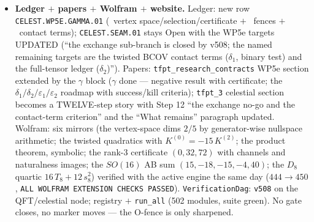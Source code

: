 \begin{itemize}[leftmargin=1.5em]
$+$ sharpened; flipped rule $m{+}j{-}j'$: $\Phi_{T_3}$ kill flip-invariant, $\Phi_P$
rule-dependent; $SO(16)$: odd classes EMPTY and AB sum $(15,-18,-15,-4,40)$ --- $T_5$ does not
even cancel ($E_8$ doubly special); $D_8$: $16\,T_8{+}12\,s_8^2$, no $T_3$ structure --- the
question cannot even be posed. Number fences \mC\ only: $32=(h,h){+}(h',h')=20{+}12$,
$72=2\tilde\lambda^2_{e_8}$.
\item \textbf{Ledger $+$ papers $+$ Wolfram $+$ website.} Ledger: new row
\texttt{CELEST.WP5E.GAMMA.01} (\mE\ vertex space/selection/certificate $+$ \mC\ fences $+$ \mO\
contact terms); \texttt{CELEST.SEAM.01} stays Open with the WP5e targets UPDATED (``the exchange
sub-branch is closed by v508; the named remaining targets are the twisted BCOV contact terms
($\delta_1$, binary test) and the full-tensor ledger ($\delta_2$)''). Papers:
\texttt{tfpt\_research\_contracts} WP5e section extended by the $\gamma$ block ($\gamma$ done ---
negative result with certificate; the $\delta_1/\delta_2/\varepsilon_1/\varepsilon_2$ roadmap with
success/kill criteria); \texttt{tfpt\_3} celestial section becomes a TWELVE-step story with Step 12
``the exchange no-go and the contact-term criterion'' and the ``What remains'' paragraph updated.
Wolfram: six mirrors (the vertex-space dims $2/5$ by generator-wise nullspace arithmetic; the
twisted quadratics with $K^{(0)}=-15\,K^{(2)}$; the product theorem, symbolic; the rank-$3$
certificate $(0,32,72)$ with channels and naturalness images; the $SO(16)$ AB sum
$(15,-18,-15,-4,40)$; the $D_8$ quartic $16\,T_8{+}12\,s_8^2$) verified with the active engine the
same day ($444\to450$, \texttt{ALL WOLFRAM EXTENSION CHECKS PASSED}). \texttt{VerificationDag}:
\texttt{v508} on the QFT/celestial node; registry $+$ \texttt{run\_all} (502 modules, suite
green). No gate closes, no marker moves --- the O-fence is only sharpened.
\end{itemize}

